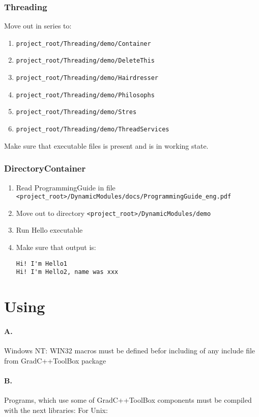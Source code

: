 \documentclass[10pt]{article}
\begin{document}
\subsubsection{ Threading }
  Move out in series to:
  \begin{enumerate} 
  \item \verb|project_root/Threading/demo/Container|
  \item \verb|project_root/Threading/demo/DeleteThis|
  \item \verb|project_root/Threading/demo/Hairdresser|
  \item \verb|project_root/Threading/demo/Philosophs| 
  \item \verb|project_root/Threading/demo/Stres|
  \item \verb|project_root/Threading/demo/ThreadServices|
  \end{enumerate}
  Make sure that executable files is present and is in working state.

\subsubsection{ DirectoryContainer }

\begin{enumerate}
 \item Read ProgrammingGuide in file \newline \verb|<project_root>/DynamicModules/docs/ProgrammingGuide_eng.pdf|
 \item Move out to directory \verb|<project_root>/DynamicModules/demo|
 \item Run Hello executable
 \item Make sure that output is:
\begin{verbatim}
Hi! I'm Hello1
Hi! I'm Hello2, name was xxx
\end{verbatim}
\end{enumerate}



\section{ Using }

\paragraph{A.}
Windows NT:
WIN32 macros must be defined befor including of any include file from GradC++ToolBox package

\paragraph{B.}
Programs, which use some of GradC++ToolBox components must be compiled with the next libraries:
\newline
\newline
For Unix:
\newline
\end{document}
